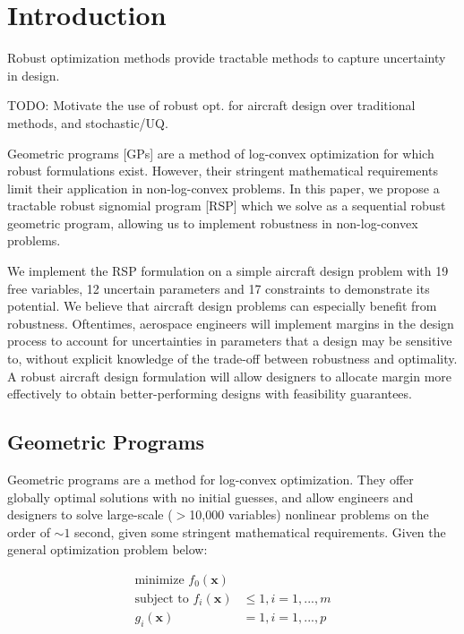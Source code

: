 \documentclass{article}
\begin{document}
\section{Introduction}

Robust optimization methods provide tractable methods to capture uncertainty in design.

TODO: Motivate the use of robust opt. for aircraft design over traditional methods, and stochastic/UQ. 

Geometric programs [GPs] are a method of log-convex optimization for which robust formulations exist. However, their stringent mathematical requirements limit their application in  non-log-convex problems. In this paper, we propose a tractable robust signomial program [RSP] which we solve as a sequential robust geometric program, allowing us to implement robustness in non-log-convex problems.

We implement the RSP formulation on a simple aircraft design problem with 19 free variables, 12 uncertain parameters and 17 constraints to demonstrate its potential. We believe that aircraft design problems can especially benefit from robustness. Oftentimes, aerospace engineers will implement margins in the design process to account for uncertainties in parameters that a design may be sensitive to, without explicit knowledge of the trade-off between robustness and optimality. A robust aircraft design formulation will allow designers to allocate margin more effectively to obtain better-performing designs with feasibility guarantees. 

\subsection{Geometric Programs}

Geometric programs are a method for log-convex optimization. They offer globally optimal solutions with no initial guesses, and allow engineers and designers to solve large-scale ($>$10,000 variables) nonlinear problems on the order of $\sim1$ second, given some stringent mathematical requirements. Given the general optimization problem below: 

\begin{align} 
\label{e:gpform}
\textrm{minimize } f_0(\mathbf{x}) & \nonumber \\
\textrm{subject to  } f_i(\mathbf{x}) &\leq 1, i=1,...,m \\
g_i (\mathbf{x}) &= 1, i = 1,...,p \nonumber
\end{align}
\end{document}
